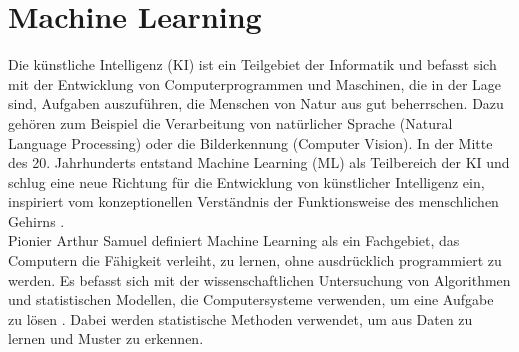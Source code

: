 \documentclass[german,bachelor]{swsLeipzig}
\begin{document}
\section{Machine Learning}
Die künstliche Intelligenz (KI) ist ein Teilgebiet der Informatik und befasst sich mit der Entwicklung von Computerprogrammen und Maschinen,
die in der Lage sind, Aufgaben auszuführen, die Menschen von Natur aus gut beherrschen.
Dazu gehören zum Beispiel die Verarbeitung von natürlicher Sprache (Natural Language Processing) oder die Bilderkennung (Computer Vision).
In der Mitte des 20. Jahrhunderts entstand Machine Learning (ML) als Teilbereich der KI und schlug eine neue Richtung
für die Entwicklung von künstlicher Intelligenz ein, inspiriert vom konzeptionellen Verständnis der Funktionsweise des menschlichen Gehirns \cite[]{2020}.\\
\indent Pionier Arthur Samuel definiert Machine Learning als ein Fachgebiet, das Computern die Fähigkeit verleiht, zu lernen,
ohne ausdrücklich programmiert zu werden.
Es befasst sich mit der wissenschaftlichen Untersuchung von Algorithmen und statistischen Modellen,
die Computersysteme verwenden, um eine Aufgabe zu lösen \cite[]{mahesh2020machine}.
Dabei werden statistische Methoden verwendet, um aus Daten zu lernen und Muster zu erkennen. \\
\end{document}
